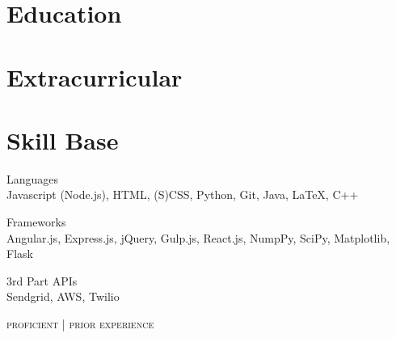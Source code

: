 \documentclass[9pt]{article}
\begin{document}
        \begin{minipage}[t]{0.35\textwidth}
            \vspace{0pt}

            \section{Education}

                

                

            \section{Extracurricular}

                

                

                

            \section{Skill Base}
            {\raggedright
                Languages \\
                {\small
                    {\color{highlight}
                        Javascript (Node.js), HTML, (S)CSS, Python, Git,
                    }
                    Java, LaTeX, C++
                }
                \vspace{5pt}

                Frameworks \\
                {\small
                    {\color{highlight}
                        Angular.js, Express.js, jQuery, Gulp.js,
                    }
                    React.js, NumpPy, SciPy, Matplotlib, Flask \\
                }

                \vspace{5pt}

                3rd Part APIs \\
                {\small
                    {\color{highlight}
                        Sendgrid, AWS,
                    }
                    Twilio
                }

                \hfill\textsc{\footnotesize{{\color{highlight} proficient} | prior experience}}
            }
        \end{minipage}
\end{document}
